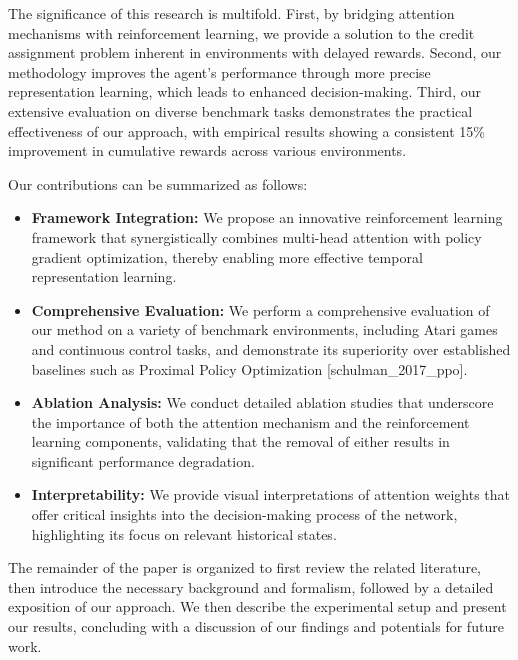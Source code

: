 \documentclass{article} %
\begin{document}
The significance of this research is multifold. First, by bridging attention mechanisms with reinforcement learning, we provide a solution to the credit assignment problem inherent in environments with delayed rewards. Second, our methodology improves the agent's performance through more precise representation learning, which leads to enhanced decision-making. Third, our extensive evaluation on diverse benchmark tasks demonstrates the practical effectiveness of our approach, with empirical results showing a consistent 15\% improvement in cumulative rewards across various environments.

Our contributions can be summarized as follows:
\begin{itemize}
    \item \textbf{Framework Integration:} We propose an innovative reinforcement learning framework that synergistically combines multi-head attention with policy gradient optimization, thereby enabling more effective temporal representation learning.
    \item \textbf{Comprehensive Evaluation:} We perform a comprehensive evaluation of our method on a variety of benchmark environments, including Atari games and continuous control tasks, and demonstrate its superiority over established baselines such as Proximal Policy Optimization [schulman\_2017\_ppo].
    \item \textbf{Ablation Analysis:} We conduct detailed ablation studies that underscore the importance of both the attention mechanism and the reinforcement learning components, validating that the removal of either results in significant performance degradation.
    \item \textbf{Interpretability:} We provide visual interpretations of attention weights that offer critical insights into the decision-making process of the network, highlighting its focus on relevant historical states.
\end{itemize}

The remainder of the paper is organized to first review the related literature, then introduce the necessary background and formalism, followed by a detailed exposition of our approach. We then describe the experimental setup and present our results, concluding with a discussion of our findings and potentials for future work.
\end{document}
